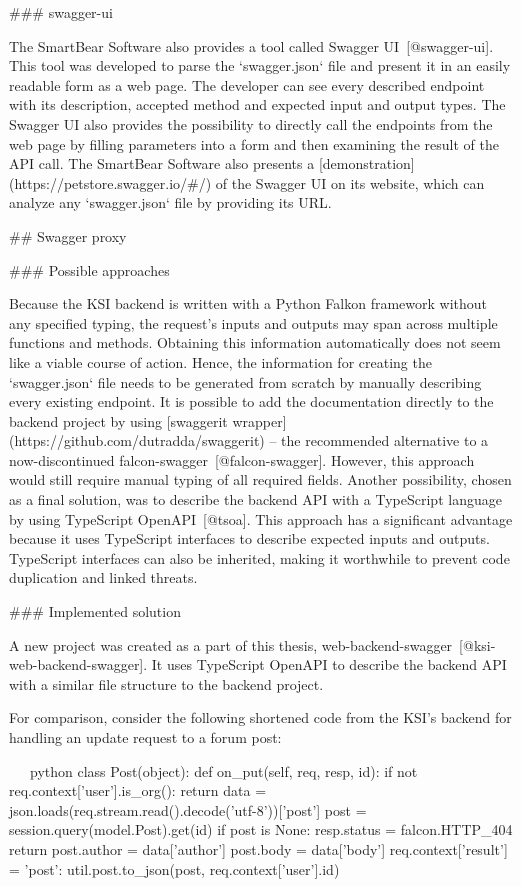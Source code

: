 \documentclass[
  digital, %
  oneside, %
  lof,     %
  nolot,     %
]{fithesis4}
\begin{document}
### swagger-ui

The SmartBear Software also provides a tool called Swagger UI~[@swagger-ui]. This tool was developed to parse the `swagger.json` file and present it in an easily readable form as a web page. The developer can see every described endpoint with its description, accepted method and expected input and output types. The Swagger UI also provides the possibility to directly call the endpoints from the web page by filling parameters into a form and then examining the result of the API call. The SmartBear Software also presents a [demonstration](https://petstore.swagger.io/#/) of the Swagger UI on its website, which can analyze any `swagger.json` file by providing its URL.

## Swagger proxy

### Possible approaches

Because the KSI backend is written with a Python Falkon framework without any specified typing, the request's inputs and outputs may span across multiple functions and methods. Obtaining this information automatically does not seem like a viable course of action. Hence, the information for creating the `swagger.json` file needs to be generated from scratch by manually describing every existing endpoint. It is possible to add the documentation directly to the backend project by using [swaggerit wrapper](https://github.com/dutradda/swaggerit) -- the recommended alternative to a now-discontinued falcon-swagger~[@falcon-swagger]. However, this approach would still require manual typing of all required fields. Another possibility, chosen as a final solution, was to describe the backend API with a TypeScript language by using TypeScript OpenAPI~[@tsoa]. This approach has a significant advantage because it uses TypeScript interfaces to describe expected inputs and outputs. TypeScript interfaces can also be inherited, making it worthwhile to prevent code duplication and linked threats.

### Implemented solution

A new project was created as a part of this thesis, web-backend-swagger~[@ksi-web-backend-swagger]. It uses TypeScript OpenAPI to describe the backend API with a similar file structure to the backend project. 

For comparison, consider the following shortened code from the KSI's backend for handling an update request to a forum post:

\newpage
~~~python
class Post(object):
    def on_put(self, req, resp, id):
        if not req.context['user'].is_org():
            return
        data = json.loads(req.stream.read().decode('utf-8'))['post']
        post = session.query(model.Post).get(id)
        if post is None:
            resp.status = falcon.HTTP_404
            return
        post.author = data['author']
        post.body = data['body']
        req.context['result'] = {'post': util.post.to_json(post, req.context['user'].id)}
~~~
\end{document}
